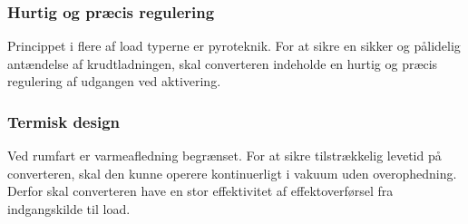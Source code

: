 \subsubsection*{Hurtig og præcis regulering}
\noindent Princippet i flere af load typerne er pyroteknik. For at sikre en sikker og pålidelig antændelse af krudtladningen, skal converteren indeholde en hurtig og præcis regulering af udgangen ved aktivering. 

\subsubsection*{Termisk design}
\noindent Ved rumfart er varmeafledning begrænset. For at sikre tilstrækkelig levetid på converteren, skal den kunne operere kontinuerligt i vakuum uden overophedning. Derfor skal converteren have en stor effektivitet af effektoverførsel fra indgangskilde til load. 

